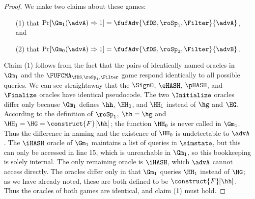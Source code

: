 \begin{proof}
	We make two claims about these games: 
	\begin{enumerate}
		\item[(1)] that $\Pr[\Gm_1(\advA)\Rightarrow 1] = \fufAdv{\fDS,\roSp_1,\Filter}{\advA}$, and 
		\item[(2)] that $\Pr[\Gm_0(\advA)\Rightarrow 1] = \fufAdv{\fDS,\roSp_2,\Filter}{\advB}$.
	\end{enumerate}
	Claim (1) follows from the fact that the pairs of identically named oracles in $\Gm_1$ and the $\FUFCMA_{\fDS, \roSp_1,\Filter}$ game respond identically to all possible queries.
	We can see straightaway that the $\SignO$, $\eHASH$, $\pHASH$, and $\Finalize$ oracles have identical pseudocode. 
	The two	$\Initialize$  oracles differ only because $\Gm_1$ defines $\hh$, $\HH_0$, and $\HH_1$ instead of $\hg$ and $\HG$.
	According to the definition of $\roSp_1$, $\hh = \hg$ and $\HH_1 = \HG = \construct{F}[\hh]$; the function $\HH_0$ is never called in $\Gm_1$. 
	Thus the difference in naming and the existence of $\HH_0$ is undetectable to $\advA$.
	The $\iHASH$ oracle of $\Gm_1$ maintains a list of queries in $\simstate$, but this can only be accessed in line 15, which is unreachable in $\Gm_1$, so this bookkeeping is solely internal.
	The only remaining oracle is $\iHASH$, which $\advA$ cannot access directly.
	The oracles differ only in that $\Gm_1$ queries $\HH_1$ instead of $\HG$; as we have already noted, these are both defined to be $\construct{F}[\hh]$.
	Thus the oracles of both games are identical, and claim (1) must hold.
	

\end{proof}
